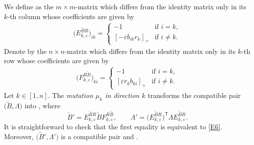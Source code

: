 \documentclass[11pt]{article}
\numberwithin{equation}{section}
\numberwithin{equation}{section}
\begin{document}
We define  as the $m\times m$-matrix which differs from the identity matrix only in its $k$-th column whose coefficients are given by
 \begin{align*}
 \bigl(E_{k,\varepsilon}^{\tilde{B}R}\bigr)_{ik}=\begin{cases}
 -1& \text{if } i=k,\\
 [-\varepsilon b_{ik}r_k]_+& \text{if } i\neq k.
 \end{cases}
 \end{align*}
 Denote by  the $n\times n$-matrix which differs from the identity matrix only in its $k$-th row whose coefficients are given by
 \begin{align*}
 \bigl(F^{R\tilde{B}}_{k,\varepsilon}\bigr)_{ki}=\begin{cases}
 -1& \text{if } i=k,\\
 [\varepsilon r_{k}b_{ki}]_+& \text{if } i\neq k.
 \end{cases}
 \end{align*}
Let $k\in [1,n]$.
The {\it mutation $\mu_k$ in direction $k$} transforms the compatible pair $\bigl(\tilde{B},\Lambda\bigr)$ into , where
\[
\tilde{B}'=E_{k,\varepsilon}^{\tilde{B}R}\tilde{B}F_{k,\varepsilon}^{R\tilde{B}},\qquad \Lambda'=\bigl(E_{k,\varepsilon}^{\tilde{B}R}\bigr)^{\mathsf T}\Lambda E_{k,\varepsilon}^{\tilde{B}R}.
\]
It is straightforward to check that the first equality is equivalent to \eqref{E6}. Moreover, $\bigl(\tilde{B}', \Lambda'\bigr)$ is a compatible pair and .
\end{document}
